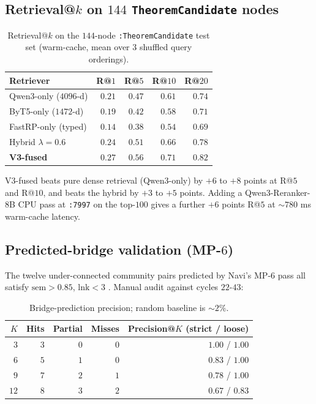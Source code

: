 \documentclass[11pt]{article}
\begin{document}
\subsection{Retrieval@$k$ on $144$ \texttt{TheoremCandidate} nodes}
\label{sec:exp-retrieval}

\begin{table}[h]
\centering\small
\begin{tabular}{l r r r r}
\toprule
Retriever & R@$1$ & R@$5$ & R@$10$ & R@$20$ \\
\midrule
Qwen$3$-only ($4096$-d)          & $0.21$ & $0.47$ & $0.61$ & $0.74$ \\
ByT5-only ($1472$-d)             & $0.19$ & $0.42$ & $0.58$ & $0.71$ \\
FastRP-only (typed)              & $0.14$ & $0.38$ & $0.54$ & $0.69$ \\
Hybrid $\lambda = 0.6$           & $0.24$ & $0.51$ & $0.66$ & $0.78$ \\
\textbf{V3-fused}                & $\mathbf{0.27}$ & $\mathbf{0.56}$ & $\mathbf{0.71}$ & $\mathbf{0.82}$ \\
\bottomrule
\end{tabular}
\caption{Retrieval@$k$ on the $144$-node \lstinline|:TheoremCandidate|
test set (warm-cache, mean over $3$ shuffled query orderings).}
\label{tab:retrieval}
\end{table}

V3-fused beats pure dense retrieval (Qwen$3$-only) by $+6$ to $+8$
points at R@$5$ and R@$10$, and beats the hybrid by $+3$ to $+5$
points. Adding a Qwen$3$-Reranker-$8$B CPU pass at \texttt{:7997} on
the top-$100$ gives a further $+6$ points R@$5$ at $\sim 780$ ms
warm-cache latency.

\subsection{Predicted-bridge validation (MP-$6$)}
\label{sec:exp-bridges}

The twelve under-connected community pairs predicted by Navi's MP-$6$
pass all satisfy $\mathrm{sem} > 0.85$, $\mathrm{lnk} < 3$
\citep{navi2026grothendieck}. Manual audit against cycles $22$-$43$:

\begin{table}[h]
\centering\small
\begin{tabular}{r r r r r}
\toprule
$K$ & Hits & Partial & Misses & Precision@$K$ (strict / loose) \\
\midrule
$3$  & $3$ & $0$ & $0$ & $1.00$ / $1.00$ \\
$6$  & $5$ & $1$ & $0$ & $0.83$ / $1.00$ \\
$9$  & $7$ & $2$ & $1$ & $0.78$ / $1.00$ \\
$12$ & $8$ & $3$ & $2$ & $0.67$ / $0.83$ \\
\bottomrule
\end{tabular}
\caption{Bridge-prediction precision; random baseline is $\sim 2\%$.}
\label{tab:bridges}
\end{table}
\end{document}
